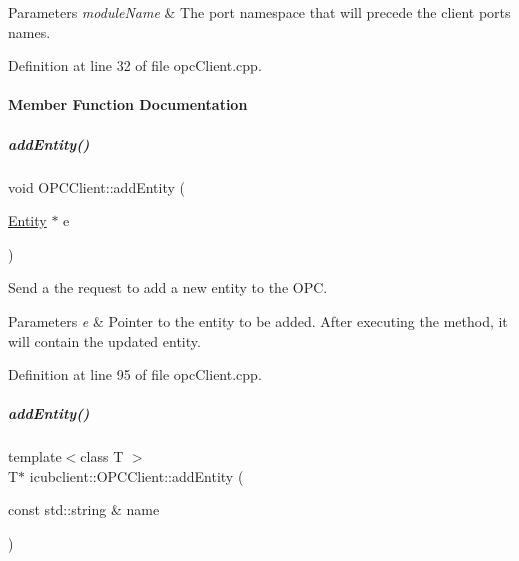\begin{DoxyParams}{Parameters}
{\em module\+Name} & The port namespace that will precede the client ports names. \\
\hline
\end{DoxyParams}


Definition at line 32 of file opc\+Client.\+cpp.



\paragraph{Member Function Documentation}
\mbox{\label{group__icubclient__clients_aeddebad5a837addc613f0234aa59d4cb}} 
\subparagraph{\texorpdfstring{add\+Entity()}{addEntity()}\hspace{0.1cm}{\footnotesize\ttfamily [1/2]}}
{\footnotesize\ttfamily void O\+P\+C\+Client\+::add\+Entity (\begin{DoxyParamCaption}\item[{\hyperlink{group__icubclient__representations_classicubclient_1_1Entity}{Entity} $\ast$}]{e }\end{DoxyParamCaption})\hspace{0.3cm}{\ttfamily [protected]}}



Send a the request to add a new entity to the O\+PC. 


\begin{DoxyParams}{Parameters}
{\em e} & Pointer to the entity to be added. After executing the method, it will contain the updated entity. \\
\hline
\end{DoxyParams}


Definition at line 95 of file opc\+Client.\+cpp.

\mbox{\label{group__icubclient__clients_a8ce1aa9d81ed8d32e53346b94f3c032c}} 
\subparagraph{\texorpdfstring{add\+Entity()}{addEntity()}\hspace{0.1cm}{\footnotesize\ttfamily [2/2]}}
{\footnotesize\ttfamily template$<$class T $>$ \\
T$\ast$ icubclient\+::\+O\+P\+C\+Client\+::add\+Entity (\begin{DoxyParamCaption}\item[{const std\+::string \&}]{name }\end{DoxyParamCaption})\hspace{0.3cm}{\ttfamily [inline]}}



